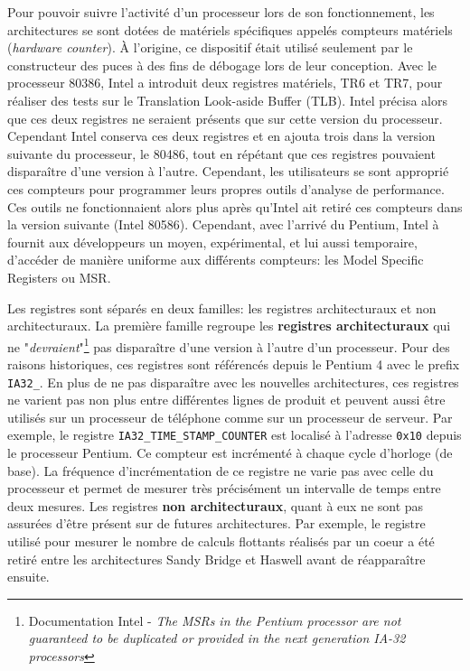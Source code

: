        Pour pouvoir suivre l'activité d'un processeur lors de son fonctionnement, les architectures se sont dotées de matériels spécifiques appelés compteurs matériels (\textit{hardware counter}). À l'origine, ce dispositif était utilisé seulement par le constructeur des puces à des fins de débogage lors de leur conception. Avec le processeur 80386, Intel a introduit deux registres matériels, TR6 et TR7, pour réaliser des tests sur le Translation Look-aside Buffer (TLB). Intel précisa alors que ces deux registres ne seraient présents que sur cette version du processeur. Cependant Intel conserva ces deux registres et en ajouta trois dans la version suivante du processeur, le 80486, tout en répétant que ces registres pouvaient disparaître d'une version à l'autre. Cependant, les utilisateurs se sont approprié ces compteurs pour programmer leurs propres outils d'analyse de performance. Ces outils ne fonctionnaient alors plus après qu'Intel ait retiré ces compteurs dans la version suivante (Intel 80586). Cependant, avec l'arrivé du Pentium, Intel à fournit aux développeurs un moyen, expérimental, et lui aussi temporaire, d'accéder de manière uniforme aux différents compteurs: les Model Specific Registers ou MSR.

        Les registres sont séparés en deux familles: les registres architecturaux et non architecturaux. 
        La première famille regroupe les \textbf{registres architecturaux} qui ne "\textit{devraient}"\footnote{Documentation Intel - \textit{The MSRs in the Pentium processor are not guaranteed to be duplicated or provided in the next generation IA-32 processors}} pas disparaître d'une version à l'autre d'un processeur. Pour des raisons historiques, ces registres sont référencés depuis le Pentium 4 avec le prefix \verb|IA32_|. En plus de ne pas disparaître avec les nouvelles architectures, ces registres ne varient pas non plus entre différentes lignes de produit et peuvent aussi être utilisés sur un processeur de téléphone comme sur un processeur de serveur. Par exemple, le registre \verb|IA32_TIME_STAMP_COUNTER| est localisé à l'adresse \verb|0x10| depuis le processeur Pentium. Ce compteur est incrémenté à chaque cycle d'horloge (de base). La fréquence d'incrémentation de ce registre ne varie pas avec celle du processeur et permet de mesurer très précisément un intervalle de temps entre deux mesures. 
        Les registres \textbf{non architecturaux}, quant à eux ne sont pas assurées d'être présent sur de futures architectures. Par exemple, le registre utilisé pour mesurer le nombre de calculs flottants réalisés par un coeur a été retiré entre les architectures Sandy Bridge et Haswell avant de réapparaître ensuite. 
    
